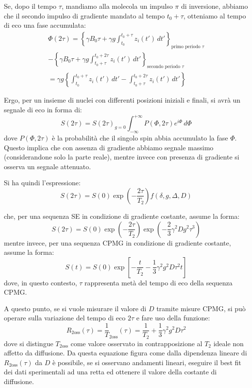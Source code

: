 Se, dopo il tempo $\tau$, mandiamo alla molecola un impulso $\pi$ di inversione, abbiamo che il secondo impulso di gradiente mandato al tempo $t_0 + \tau$, otteniamo al tempo di eco una fase accumulata:
\begin{multline}
	\Phi(2\tau) = \left\{ \gamma B_0 \tau + \gamma g \int_{t_0}^{t_0 + \tau}z_i(t')\,dt'\right\}_{\text{primo periodo } \tau} \\- \left\{ \gamma B_0 \tau + \gamma g \int_{t_0 + \tau}^{t_0 + 2\tau}z_i(t')\,dt'\right\}_{\text{secondo periodo } \tau}
	\\
	= \gamma g \left\{ \int_{t_0}^{t_0+\tau}z_i(t')\,dt' - \int_{t_0 + \tau}^{t_0 + 2\tau}z_i(t')\,dt' \right\}
\end{multline}

Ergo, per un insieme di nuclei con differenti posizioni iniziali e finali, si avrà un segnale di eco in forma di:
\begin{equation}
	S(2\tau) = S(2\tau)_{g=0}\int_{-\infty}^{+\infty} P(\Phi,2\tau)e^{i\Phi}\,d\Phi
\end{equation}
dove $P(\Phi,2\tau)$ è la probabilità che il singolo spin abbia accumulato la fase $\Phi$. Questo implica che con assenza di gradiente abbiamo segnale massimo (considerandone solo la parte reale), mentre invece con presenza di gradiente si osserva un segnale attenuato.

Si ha quindi l'espressione:
\begin{equation}
	S(2\tau) = S(0) \exp\left(-\frac{2\tau}{T_2}\right) f(\delta,g,\Delta,D)
\end{equation}

che, per una sequenza SE in condizione di gradiente costante, assume la forma:
\begin{equation}
	S(2\tau) = S(0)\exp(-\frac{2\tau}{T_2})\exp(-\frac{2}{3}\gamma^2Dg^2\tau^3)
\end{equation}
mentre invece, per una sequenza CPMG in condizione di gradiente costante, assume la forma:
\begin{equation}
	S(t) = S(0)\exp\left[-\frac{t}{T_2}-\frac{1}{3}\gamma^2 g^2 D\tau^2 t\right]
\end{equation}
dove, in questo contesto, $\tau$ rappresenta metà del tempo di eco della sequenza CPMG.

A questo punto, se si vuole misurare il valore di $D$ tramite misure CPMG, si può operare sulla variazione del tempo di eco $2\tau$ e fare uso della funzione:
\begin{equation}
	R_{\text{2oss}}(\tau) = \frac{1}{T}_{\text{2oss}}(\tau)=\frac{1}{T_2}+\frac{1}{3}\gamma^2g^2D\tau^2
\label{eq:R}
\end{equation}
dove si distingue $T_{\text{2oss}}$ come valore osservato in contrapposizione al $T_2$ ideale non affetto da diffusione. Da questa equazione figura come dalla dipendenza lineare di $R_{\text{2oss}}(\tau)$ da $D$ è possibile, se si osservano andamenti lineari, eseguire il best fit dei dati sperimentali ad una retta ed ottenere il valore della costante di diffusione.

